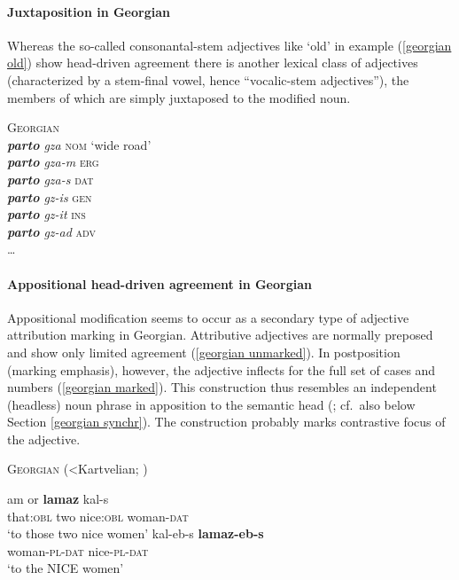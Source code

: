 \paragraph{Juxtaposition in Georgian}
Whereas the so-called consonantal-stem adjectives like ‘old’ in example (\ref{georgian old}) show head-driven agreement there is another lexical class of adjectives (characterized by a stem-final vowel, hence “vocalic-stem adjectives”), the members of which are simply juxtaposed to the modified noun.
\begin{exe}
\ex \textsc{Georgian} \cite[236]{aronson1991}\\
\textit{\textbf{parto} gza} \textsc{nom} ‘wide road’\\
\textit{\textbf{parto} gza-m} \textsc{erg}\\
\textit{\textbf{parto} gza-s} \textsc{dat}\\
\textit{\textbf{parto} gz-is} \textsc{gen}\\
\textit{\textbf{parto} gz-it} \textsc{ins}\\
\textit{\textbf{parto} gz-ad} \textsc{adv}\\
\dots
\end{exe}

\paragraph{Appositional head-driven agreement in Georgian}
Appositional modification seems to occur as a secondary type of adjective attribution marking in Georgian. Attributive adjectives are normally preposed and show only limited agreement (\ref{georgian unmarked}). In postposition (marking emphasis), however, the adjective inflects for the full set of cases and numbers (\ref{georgian marked}). This construction thus resembles an independent (headless) noun phrase in apposition to the semantic head (\citealt[652, 677]{testelec1998}; cf.~also below Section \ref{georgian synchr}). The construction probably marks contrastive focus of the adjective.
\begin{exe}
\ex \textsc{Georgian} (<Kartvelian; \citealt[652]{testelec1998})
\begin{xlist}
\ex \label{georgian unmarked}
\gll	am or \textbf{lamaz} kal-s\\
	that:\textsc{obl} two nice:\textsc{obl} woman-\textsc{dat}\\
\glt	‘to those two nice women’
\ex \label{georgian marked}
\gll	kal-eb-s \textbf{lamaz-eb-s}\\
	woman-\textsc{pl}-\textsc{dat} nice-\textsc{pl}-\textsc{dat}\\
\glt	‘to the NICE women’
\end{xlist}
\end{exe}

